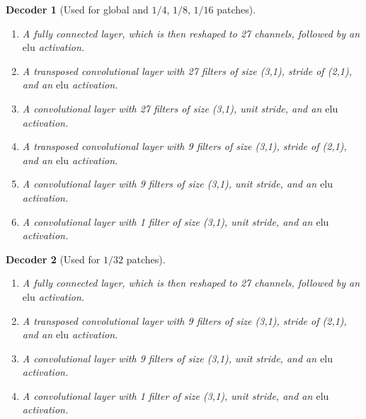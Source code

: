 \documentclass[final,3p]{elsarticle}
\theoremstyle{break}
\newtheorem{decoder}{Decoder}
\begin{document}
\begin{decoder}[Used for global and $1/4$, $1/8$, $1/16$ patches]\label{model:d_correct}
\begin{enumerate}
    \item A fully connected layer, which is then reshaped to 27 channels, followed by an $\mathrm{elu}$ activation.
 	\item A transposed convolutional layer with 27 filters of size (3,1), stride of (2,1), and an $\mathrm{elu}$ activation.
 	\item A convolutional layer with 27 filters of size (3,1), unit stride, and an $\mathrm{elu}$ activation.
 	\item A transposed convolutional layer with 9 filters of size (3,1), stride of (2,1), and an $\mathrm{elu}$ activation.
 	\item A convolutional layer with 9 filters of size (3,1), unit stride, and an $\mathrm{elu}$ activation.
 	\item A convolutional layer with 1 filter of size (3,1), unit stride, and an $\mathrm{elu}$ activation.
\end{enumerate}
\end{decoder}

\begin{decoder}[Used for $1/32$ patches]\label{model:d_correct_32}
\begin{enumerate}
    \item A fully connected layer, which is then reshaped to 27 channels, followed by an $\mathrm{elu}$ activation.
 	\item A transposed convolutional layer with 9 filters of size (3,1), stride of (2,1), and an $\mathrm{elu}$ activation.
 	\item A convolutional layer with 9 filters of size (3,1), unit stride, and an $\mathrm{elu}$ activation.
 	\item A convolutional layer with 1 filter of size (3,1), unit stride, and an $\mathrm{elu}$ activation.
\end{enumerate}
\end{decoder}
\end{document}
